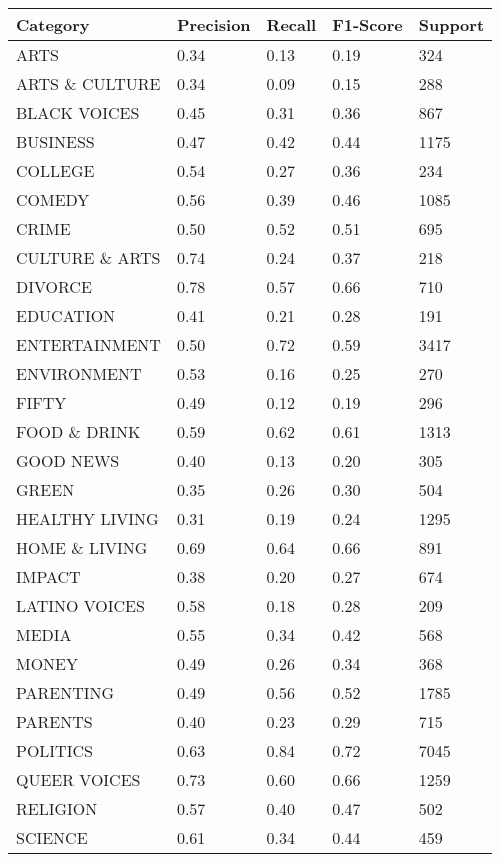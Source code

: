 \documentclass{article}
\begin{document}
\begin{table}[h]
    \centering
    \begin{tabular}{|l|l|l|l|l|}
    \hline
    Category & Precision & Recall & F1-Score & Support \\
    \hline
    ARTS & 0.34 & 0.13 & 0.19 & 324 \\
    ARTS \& CULTURE & 0.34 & 0.09 & 0.15 & 288 \\
    BLACK VOICES & 0.45 & 0.31 & 0.36 & 867 \\
    BUSINESS & 0.47 & 0.42 & 0.44 & 1175 \\
    COLLEGE & 0.54 & 0.27 & 0.36 & 234 \\
    COMEDY & 0.56 & 0.39 & 0.46 & 1085 \\
    CRIME & 0.50 & 0.52 & 0.51 & 695 \\
    CULTURE \& ARTS & 0.74 & 0.24 & 0.37 & 218 \\
    DIVORCE & 0.78 & 0.57 & 0.66 & 710 \\
    EDUCATION & 0.41 & 0.21 & 0.28 & 191 \\
    ENTERTAINMENT & 0.50 & 0.72 & 0.59 & 3417 \\
    ENVIRONMENT & 0.53 & 0.16 & 0.25 & 270 \\
    FIFTY & 0.49 & 0.12 & 0.19 & 296 \\
    FOOD \& DRINK & 0.59 & 0.62 & 0.61 & 1313 \\
    GOOD NEWS & 0.40 & 0.13 & 0.20 & 305 \\
    GREEN & 0.35 & 0.26 & 0.30 & 504 \\
    HEALTHY LIVING & 0.31 & 0.19 & 0.24 & 1295 \\
    HOME \& LIVING & 0.69 & 0.64 & 0.66 & 891 \\
    IMPACT & 0.38 & 0.20 & 0.27 & 674 \\
    LATINO VOICES & 0.58 & 0.18 & 0.28 & 209 \\
    MEDIA & 0.55 & 0.34 & 0.42 & 568 \\
    MONEY & 0.49 & 0.26 & 0.34 & 368 \\
    PARENTING & 0.49 & 0.56 & 0.52 & 1785 \\
    PARENTS & 0.40 & 0.23 & 0.29 & 715 \\
    POLITICS & 0.63 & 0.84 & 0.72 & 7045 \\
    QUEER VOICES & 0.73 & 0.60 & 0.66 & 1259 \\
    RELIGION & 0.57 & 0.40 & 0.47 & 502 \\
    SCIENCE & 0.61 & 0.34 & 0.44 & 459 \\

\end{tabular}
\end{table}
\end{document}
